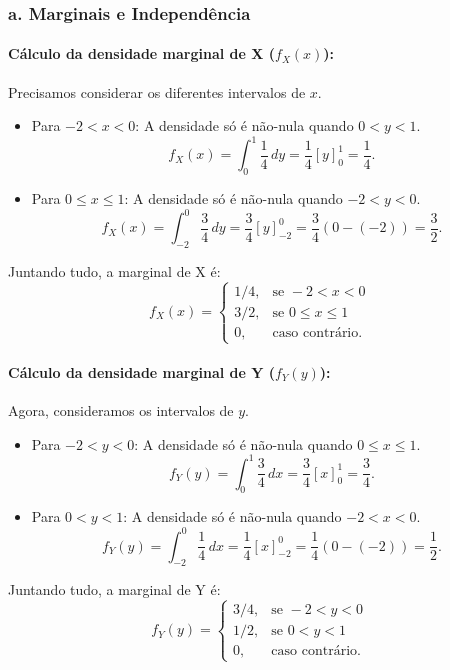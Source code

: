 \documentclass[12pt]{article}
\begin{document}
\subsubsection*{a. Marginais e Independência}

\paragraph{Cálculo da densidade marginal de X ($f_X(x)$):}
Precisamos considerar os diferentes intervalos de $x$.

\begin{itemize}
    \item Para $-2 < x < 0$: A densidade só é não-nula quando $0 < y < 1$.
    \[ f_X(x) = \int_{0}^{1} \frac{1}{4} \,dy = \frac{1}{4}[y]_{0}^{1} = \frac{1}{4}. \]
    \item Para $0 \le x \le 1$: A densidade só é não-nula quando $-2 < y < 0$.
    \[ f_X(x) = \int_{-2}^{0} \frac{3}{4} \,dy = \frac{3}{4}[y]_{-2}^{0} = \frac{3}{4}(0 - (-2)) = \frac{3}{2}. \]
\end{itemize}
Juntando tudo, a marginal de X é:
\[ f_X(x) = \begin{cases}
1/4, & \text{se } -2 < x < 0 \\
3/2, & \text{se } 0 \le x \le 1 \\
0, & \text{caso contrário.}
\end{cases} \]

\paragraph{Cálculo da densidade marginal de Y ($f_Y(y)$):}
Agora, consideramos os intervalos de $y$.

\begin{itemize}
    \item Para $-2 < y < 0$: A densidade só é não-nula quando $0 \le x \le 1$.
    \[ f_Y(y) = \int_{0}^{1} \frac{3}{4} \,dx = \frac{3}{4}[x]_{0}^{1} = \frac{3}{4}. \]
    \item Para $0 < y < 1$: A densidade só é não-nula quando $-2 < x < 0$.
    \[ f_Y(y) = \int_{-2}^{0} \frac{1}{4} \,dx = \frac{1}{4}[x]_{-2}^{0} = \frac{1}{4}(0 - (-2)) = \frac{1}{2}. \]
\end{itemize}
Juntando tudo, a marginal de Y é:
\[ f_Y(y) = \begin{cases}
3/4, & \text{se } -2 < y < 0 \\
1/2, & \text{se } 0 < y < 1 \\
0, & \text{caso contrário.}
\end{cases} \]
\end{document}
